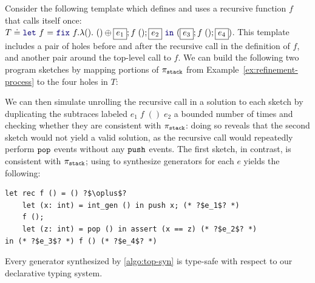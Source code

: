 \begin{example}
  Consider the following template which defines and uses a recursive
  function $f$ that calls itself once:
  $T \doteq \zlet{f}{\mykw{fix}\ f.\lambda ().\ () \oplus \boxed{e_1};
    f\;(); \boxed{e_2}}{(\boxed{e_3};f\;();\boxed{e_4})}$. This
  template includes a pair of holes before and after the recursive
  call in the definition of $f$, and another pair around the top-level
  call to $f$. We can build the following two program sketches by
  mapping portions of $\pi_{\tt stack}$ from
  Example~\ref{ex:refinement-process} to the four holes in $T$: %
  \vspace{-.4cm} \par{}\vspace{-.3cm} \par\nobreak \noindent %
  We can then simulate unrolling the recursive call in a solution to
  each sketch by duplicating the subtraces labeled $e_1\; f\;()\;
  e_2$ a bounded number of times and checking whether they are consistent with
  $\pi_{\tt stack}$: doing so reveals that the second sketch would
  not yield a valid solution, as the recursive call would repeatedly
  perform $\boldsymbol{{\tt pop}}$ events without any $\boldsymbol{{\tt push}}$ events. The
  first sketch, in contrast, is consistent with $\pi_{\tt stack}$;
  using \deriveTrace{} to synthesize generators for each $e$ yields
  the following:
  \vspace{-.4cm}
  \begin{verbatim}
let rec f () = () ?$\oplus$?
    let (x: int) = int_gen () in push x; (* ?$e_1$? *)
    f ();
    let (z: int) = pop () in assert (x == z) (* ?$e_2$? *)
in (* ?$e_3$? *) f () (* ?$e_4$? *)
\end{verbatim}
\vspace{-.2cm}
\end{example}

\begin{theorem}
  \label{theorem:algo-sound}
  Every generator synthesized by \autoref{algo:top-syn} is type-safe
  with respect to our declarative typing system.
\end{theorem}
